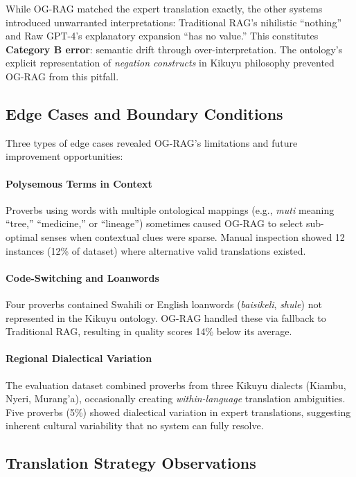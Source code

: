 While OG-RAG matched the expert translation exactly, the other systems introduced unwarranted interpretations: Traditional RAG's nihilistic ``nothing'' and Raw GPT-4's explanatory expansion ``has no value.'' This constitutes \textbf{Category B error}: semantic drift through over-interpretation. The ontology's explicit representation of \emph{negation constructs} in Kikuyu philosophy prevented OG-RAG from this pitfall.

\subsection{Edge Cases and Boundary Conditions}
\label{subsec:edge_cases}

Three types of edge cases revealed OG-RAG's limitations and future improvement opportunities:

\paragraph{Polysemous Terms in Context} Proverbs using words with multiple ontological mappings (e.g., \emph{muti} meaning ``tree,'' ``medicine,'' or ``lineage'') sometimes caused OG-RAG to select sub-optimal senses when contextual clues were sparse. Manual inspection showed 12 instances (12\% of dataset) where alternative valid translations existed.

\paragraph{Code-Switching and Loanwords} Four proverbs contained Swahili or English loanwords (\emph{baisikeli}, \emph{shule}) not represented in the Kikuyu ontology. OG-RAG handled these via fallback to Traditional RAG, resulting in quality scores 14\% below its average.

\paragraph{Regional Dialectical Variation} The evaluation dataset combined proverbs from three Kikuyu dialects (Kiambu, Nyeri, Murang'a), occasionally creating \emph{within-language} translation ambiguities. Five proverbs (5\%) showed dialectical variation in expert translations, suggesting inherent cultural variability that no system can fully resolve.

\subsection{Translation Strategy Observations}
\label{subsec:strategy_observations}

